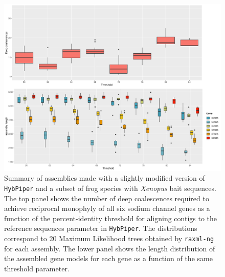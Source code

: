 \documentclass{article}
\begin{document}
\begin{figure}[h!]
    \centering
    \includegraphics[scale=0.5]{figures/summary_alignments_xen_ref_HPfixed.pdf}
    \caption{Summary of assemblies made with a slightly modified version of \texttt{HybPiper} and a subset of frog species with \textit{Xenopus} bait sequences. The top panel shows the number of deep coalescences required to achieve reciprocal monophyly of all six sodium channel genes as a function of the percent-identity threshold for aligning contigs to the reference sequences parameter in \texttt{HybPiper}. The distributions correspond to 20 Maximum Likelihood trees obtained by \texttt{raxml-ng} for each assembly. The lower panel shows the length distribution of the assembled gene models for each gene as a function of the same threshold parameter.}
    \label{fig:my_label}
\end{figure}
\clearpage
\end{document}
